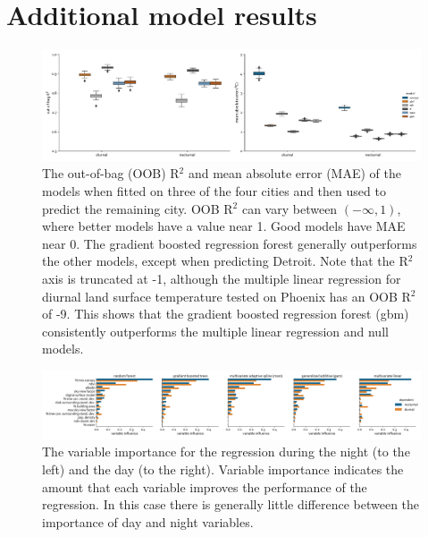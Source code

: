 \documentclass[final,3p,times,twocolumn,sort&compress]{elsarticle}
\begin{document}
\section{Additional model results}
\begin{figure}
    \centering
    \includegraphics[width=\linewidth]{fig/report/holdout_results_100.pdf}
    \caption{
    The out-of-bag (OOB) R$^2$ and mean absolute error (MAE) of the models when fitted on three of the four cities and then used to predict the remaining city. OOB R$^2$ can vary between $(-\infty, 1)$, where better models have a value near 1. Good models have MAE near 0. The gradient boosted regression forest generally outperforms the other models, except when predicting Detroit. Note that the R$^2$ axis is truncated at -1, although the multiple linear regression for diurnal land surface temperature tested on Phoenix has an OOB R$^2$ of -9.  This shows that the gradient boosted regression forest (gbm) consistently outperforms the multiple linear regression and null models.
    }
    \label{fig:holdout_results}
\end{figure}



\begin{figure}[h]
\begin{center}
\includegraphics[width=\textwidth]{fig/report/variableImportance_100.pdf}
\caption{The variable importance for the regression during the night (to the left) and the day (to the right). Variable importance indicates the amount that each variable improves the performance of the regression.
In this case there is generally little difference between the importance of day and night variables.}
\label{fig:importance}
\end{center}
\end{figure}
\end{document}
